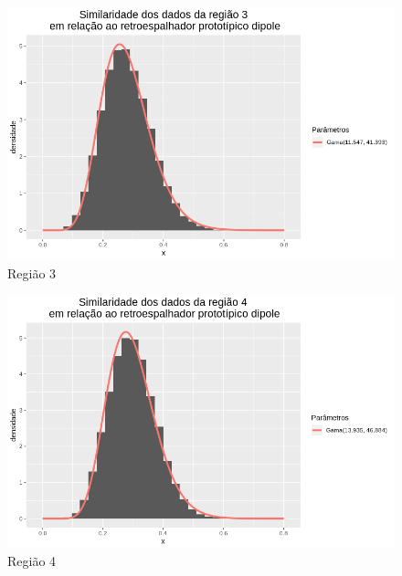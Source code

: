 \documentclass[12pt]{article}
\begin{document}
\begin{figure}[!h]
    \centering
    \vspace{0.1\linewidth}
    \includegraphics[width = \linewidth]{../../Images/Report_18_12_20/dip_region3.png}
    \caption{Região 3}
    \label{fig:dip_r3}
\end{figure}

\begin{figure}[!h]
    \centering
    \vspace{0.1\linewidth}
    \includegraphics[width = \linewidth]{../../Images/Report_18_12_20/dip_region4.png}
    \caption{Região 4}
    \label{fig:dip_r4}
\end{figure}
\end{document}
